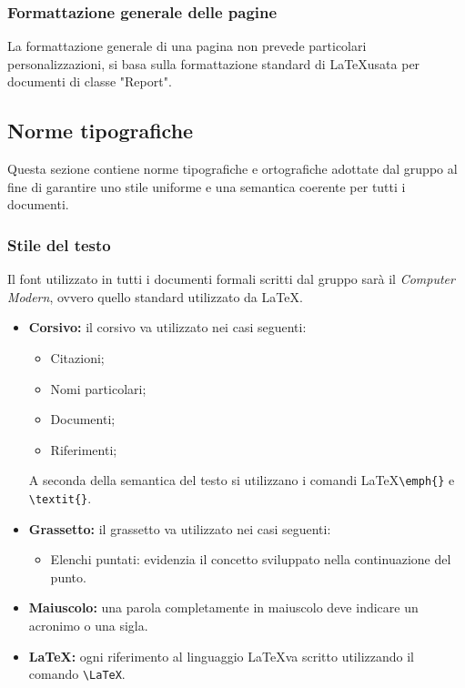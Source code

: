\documentclass[a4paper]{report}
\begin{document}
	\subsubsection{Formattazione generale delle pagine}
	La formattazione generale di una pagina non prevede particolari personalizzazioni, si basa 
	sulla formattazione standard di \LaTeX \space usata per documenti di classe "Report". 
	\subsection{Norme tipografiche}
	Questa sezione contiene norme tipografiche e ortografiche adottate dal gruppo al fine di garantire uno stile
	uniforme e una semantica coerente per tutti i documenti.  
	\subsubsection{Stile del testo}
		Il font utilizzato in tutti i documenti formali scritti dal gruppo sarà il \emph{Computer Modern}, ovvero
		quello standard utilizzato da \LaTeX.
	\begin{itemize}
		\item \textbf{Corsivo:} il corsivo va utilizzato nei casi seguenti:
		\begin{itemize}
			\item Citazioni;
			\item Nomi particolari;
			\item Documenti;
			\item Riferimenti;
		\end{itemize}
		A seconda della semantica del testo si utilizzano i comandi \LaTeX \space \verb|\emph{}| e \verb|\textit{}|.
		\item \textbf{Grassetto:} il grassetto va utilizzato nei casi seguenti:
		\begin{itemize}
			\item Elenchi puntati: evidenzia il concetto sviluppato nella continuazione del punto.
		\end{itemize}
		\item \textbf{Maiuscolo:} una parola completamente in maiuscolo deve indicare un acronimo o una sigla.
		\item \textbf{\LaTeX:} ogni riferimento al linguaggio \LaTeX \space va scritto utilizzando il comando
		\verb|\LaTeX|.
	\end{itemize}
\end{document}
